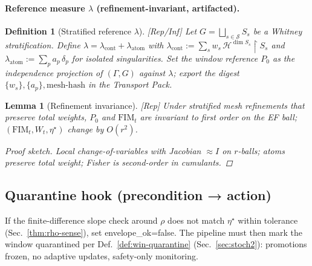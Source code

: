 \documentclass[10pt]{article}
\newcommand{\FIM}{\mathrm{FIM}}
\newenvironment{proofsketch}{\begin{proof}[Proof sketch]}{\end{proof}}
\newcommand{\cont}{{\mathrm{cont}}}
\newcommand{\atom}{{\mathrm{atom}}}
\newcommand{\layertag}[1]{\textup{[#1]}}
\newtheorem{lemma}{Lemma}
\newtheorem{definition}{Definition}
\begin{document}
\paragraph{Reference measure $\lambda$ (refinement-invariant, artifacted).}
\begin{definition}[Stratified reference $\lambda$]\label{def:ref2}
\emph{\layertag{Rep/Inf}}
Let $G=\bigsqcup_{s\in\mathcal S} S_s$ be a Whitney stratification.
Define $\lambda=\lambda_{\cont}+\lambda_{\atom}$ with
$\lambda_{\cont} := \sum_{s} w_s\,\mathcal H^{\dim S_s}\!\!\restriction S_s$ and
$\lambda_{\atom}:=\sum_{p} a_p\,\delta_p$ for isolated singularities.
Set the window reference $P_0$ as the independence projection of $(\Gamma,G)$ against $\lambda$; export the digest $\{w_s\},\{a_p\},\text{mesh-hash}$ in the Transport Pack.
\end{definition}

\begin{lemma}[Refinement invariance]\label{lem:refinement}
\emph{\layertag{Rep}}
Under stratified mesh refinements that preserve total weights, $P_0$ and $\FIM_t$ are invariant to first order on the EF ball; $(\FIM_t,W_t,\eta^\star)$ change by $O(r^2)$.
\begin{proofsketch}
Local change-of-variables with Jacobian $\approx I$ on $r$-balls; atoms preserve total weight; Fisher is second-order in cumulants.
\end{proofsketch}
\end{lemma}

\subsection*{Quarantine hook (precondition → action)}
If the finite-difference slope check around $\rho$ does not match $\eta^\star$ within tolerance (Sec.~\ref{thm:rho-sense}), set \textsf{envelope\_ok}=\textsf{false}.
The pipeline must then mark the window \textsf{quarantined} per Def.~\ref{def:win-quarantine} (Sec.~\ref{sec:stoch2}): promotions frozen, no adaptive updates, safety-only monitoring.

\end{document}
